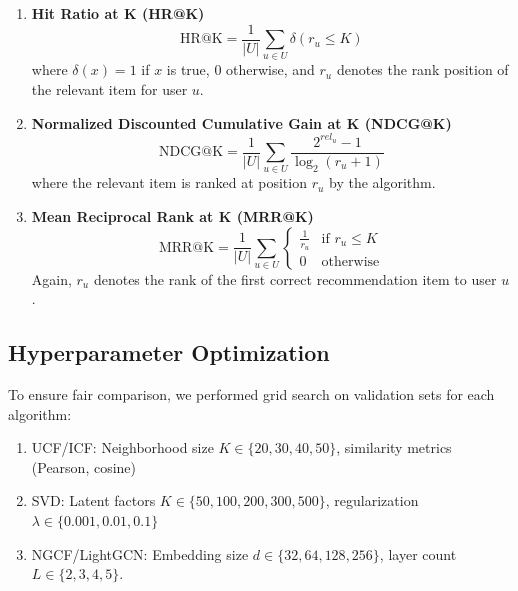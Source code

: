\documentclass[sigconf,nonacm]{acmart} %
\begin{document}
\begin{enumerate}  
    \item \textbf{Hit Ratio at K (HR@K)}  
    \begin{equation}  
    \text{HR@K} = \frac{1}{|U|}\sum_{u \in U} \delta(r_u \leq K)  
    \label{eq:hr}  
    \end{equation}  
    where $\delta(x) = 1$ if $x$ is true, $0$ otherwise, and $r_u$ denotes the rank position of the relevant item for user $u$.  
    
    \item \textbf{Normalized Discounted Cumulative Gain at K (NDCG@K)}  
    \begin{equation}  
    \text{NDCG@K} = \frac{1}{|U|}\sum_{u \in U}\frac{2^{rel_u} - 1}{\log_2(r_u + 1)}  
    \label{eq:ndcg}  
    \end{equation}  
    where the relevant item is ranked at position $r_u$ by the algorithm.  
    
    \item \textbf{Mean Reciprocal Rank at K (MRR@K)}  
    \begin{equation}  
    \text{MRR@K} = \frac{1}{|U|} \sum_{u \in U} \begin{cases}   
    \frac{1}{r_u} & \text{if } r_u \leq K \\
    0 & \text{otherwise}  
    \end{cases}  
    \label{eq:mrr}  
    \end{equation}  
    Again, $r_u$ denotes the rank of the first correct recommendation item to user $u$.  
\end{enumerate}  

\subsection{Hyperparameter Optimization}  
To ensure fair comparison, we performed grid search on validation sets for each algorithm:  
\begin{enumerate}  
    \item UCF/ICF: Neighborhood size $K \in \{20, 30, 40, 50\}$, similarity metrics (Pearson, cosine)  
    \item SVD: Latent factors $K \in \{50, 100, 200, 300, 500\}$, regularization $\lambda \in \{0.001, 0.01, 0.1\}$  
    \item NGCF/LightGCN: Embedding size $d \in \{32, 64, 128, 256\}$, layer count $L \in \{2, 3, 4, 5\}$.  
\end{enumerate}  
\end{document}
